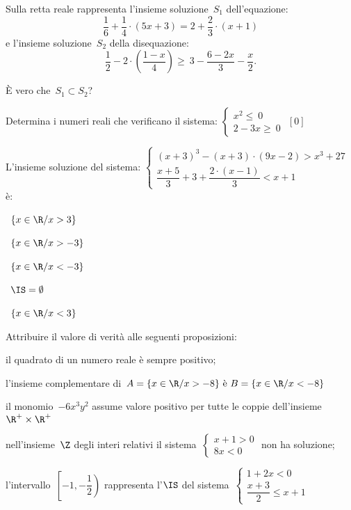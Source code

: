 \begin{esercizio}
 \label{ese:21.33}
Sulla retta reale rappresenta l'insieme soluzione~\(S_{1}\)
dell'equazione:
\[\dfrac{1}{6}+\dfrac{1}{4}\cdot (5x+3)=2+\dfrac{2}{3}\cdot (x+1)\]
e l'insieme soluzione~\(S_{2}\) della disequazione:
\[\dfrac{1}{2}-2\cdot\left(\dfrac{1-x}{4}\right)\ge
~3-\dfrac{6-2x}{3}-\dfrac{x}{2}.\]

È vero che~\(S_{1}\subset S_{2}\)?
\end{esercizio}

\begin{esercizio}[*]
 \label{ese:21.34}
 Determina i numeri reali che verificano il sistema:
 \(\left\{%
  \begin{array}{l}
  x^{2}\le~0
  \\2-3x\ge~0
 \end{array}\right.\)
 \hfill \(\left[0\right]\)
 \end{esercizio}

\begin{esercizio}
 \label{ese:21.35}
 L'insieme soluzione del sistema:
\(\left\{\begin{array}{l}
  (x+3)^{3}-(x+3)\cdot (9x-2)>x^{3}+27\\
  \dfrac{x+5}{3}+3+\dfrac{2\cdot (x-1)}{3}<x+1
 \end{array}\right.\) è:
\begin{htmulticols}{2}
\quad~\(\left\{x\in \R/x>3\right\}\)

\quad~\(\left\{x\in \R/x>-3\right\}\)

\quad~\(\left\{x\in \R/x<-3\right\}\)

\quad~\(\IS=\emptyset \)

\quad~\(\left\{x\in\R/x<3\right\}\)
\end{htmulticols}

\end{esercizio}

\begin{esercizio}
 \label{ese:21.36}
 Attribuire il valore di verità alle seguenti proposizioni:

\begin{enumeratea}
\item il quadrato di un numero reale è sempre positivo;
\item l'insieme complementare di~\(A=\{x\in\R/x>-8\}\text{ è 
}B=\{x\in\R/x<-8\}\)
\item il monomio~\(-6x^{3}y^{2}\) assume valore positivo per tutte le coppie 
dell'insieme~\(\R^{+}\times\R^{+}\)
\item nell'insieme~\(\Z\) degli interi relativi il 
sistema~\(\left\{\begin{array}{l}x+1>0\\8x<0\end{array}\right.\) non ha 
soluzione;
\item l'intervallo~\(\left[-1,\left.-{\dfrac{1}{2}}\right)\right.\) 
rappresenta 
l'\(\IS\) del sistema~\(\left\{\begin{array}{l}1+2x<0 \\\dfrac{x+3}{2}\le 
x+1\end{array}\right.\)
\end{enumeratea}
\end{esercizio}

